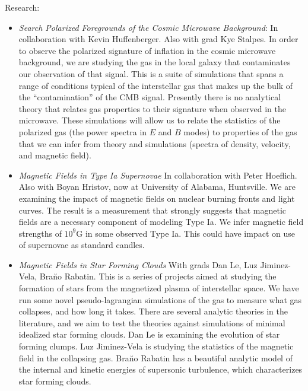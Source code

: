 \noindent
Research:
\begin{itemize}
    \item \emph{Search Polarized Foregrounds of the Cosmic Microwave
        Background}:  In collaboration with Kevin Huffenberger.  Also with grad
        Kye Stalpes.  In order
        to observe the polarized signature of inflation in the cosmic microwave
        background, we are studying the gas in the local galaxy that
        contaminates our observation of that signal.  This is a suite of simulations
        that spans a range of conditions typical of the interstellar gas that
        makes up the bulk of the ``contamination'' of the CMB signal. Presently
        there is no analytical theory that relates gas properties to their
        signature when observed in the microwave.  These
        simulations will allow us to relate the statistics of the polarized gas
        (the power spectra in $E$ and $B$ modes) to properties of the gas that
        we can infer from theory and simulations (spectra of density, velocity,
        and magnetic field).  
    \item \emph{Magnetic Fields in Type Ia Supernovae} In collaboration with
        Peter Hoeflich.  Also with Boyan Hristov, now at University of Alabama,
        Huntsville.  We are examining the impact of magnetic fields on
        nuclear burning fronts and light curves.  The result is a measurement
        that strongly suggests that magnetic fields are a necessary component of
        modeling Type Ia.  We infer magnetic field strengths of $10^9$G in some
        observed Type Ia.  This could have impact on use of supernovae as
        standard candles.
    \item \emph{Magnetic Fields in Star Forming Clouds}
        With grads Dan Le, Luz Jiminez-Vela, Bra\u no Rabatin.  This is a series of
        projects aimed at studying the formation of stars from the magnetized
        plasma of interstellar space.  We have run some novel pseudo-lagrangian
        simulations of the gas to measure what gas collapses, and how long it
        takes.  There are several analytic theories in the literature, and we
        aim to test the theories against simulations of minimal idealized star
        forming clouds.  Dan Le is examining the evolution of star forming
        clumps.  Luz Jiminez-Vela is studying the statistics of the magnetic
        field in the collapsing gas.  Bra\u no Rabatin has a beautiful analytic
        model of the internal and kinetic energies of supersonic turbulence,
        which characterizes star forming clouds.


\end{itemize}
